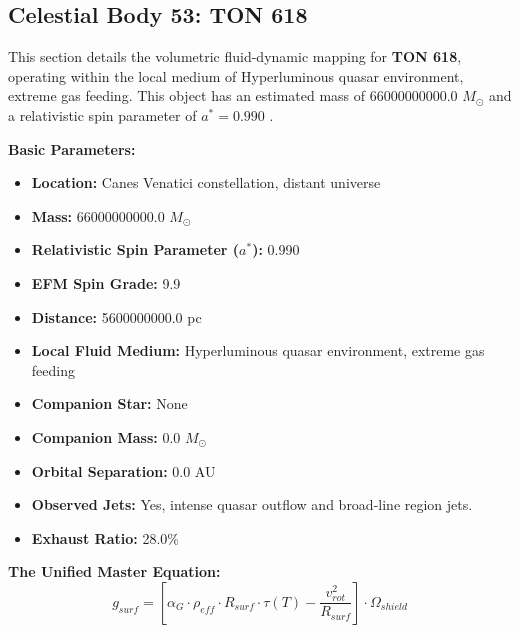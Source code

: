 \documentclass[11pt, a4paper]{article}
\begin{document}
\clearpage
\subsection{Celestial Body 53: TON 618}
This section details the volumetric fluid-dynamic mapping for \textbf{TON 618}, operating within the local medium of Hyperluminous quasar environment, extreme gas feeding. This object has an estimated mass of 66000000000.0 $M_{\odot}$ and a relativistic spin parameter of $a^* = 0.990$ \cite{shemmer2004, ned}.

\vspace{0.5em}
\noindent \textbf{Basic Parameters:}
\begin{itemize}
  \item \textbf{Location:} Canes Venatici constellation, distant universe
  \item \textbf{Mass:} 66000000000.0 $M_{\odot}$
  \item \textbf{Relativistic Spin Parameter ($a^*$):} 0.990
  \item \textbf{EFM Spin Grade:} 9.9
  \item \textbf{Distance:} 5600000000.0 pc
  \item \textbf{Local Fluid Medium:} Hyperluminous quasar environment, extreme gas feeding
  \item \textbf{Companion Star:} None
  \item \textbf{Companion Mass:} 0.0 $M_{\odot}$
  \item \textbf{Orbital Separation:} 0.0 AU
  \item \textbf{Observed Jets:} Yes, intense quasar outflow and broad-line region jets.
  \item \textbf{Exhaust Ratio:} 28.0\%
\end{itemize}

\vspace{0.5em}
\noindent \textbf{The Unified Master Equation:}
$$ g_{surf} = \left[ \alpha_G \cdot \rho_{eff} \cdot R_{surf} \cdot \tau(T) - \frac{v_{rot}^2}{R_{surf}} \right] \cdot \Omega_{shield} $$
\end{document}
